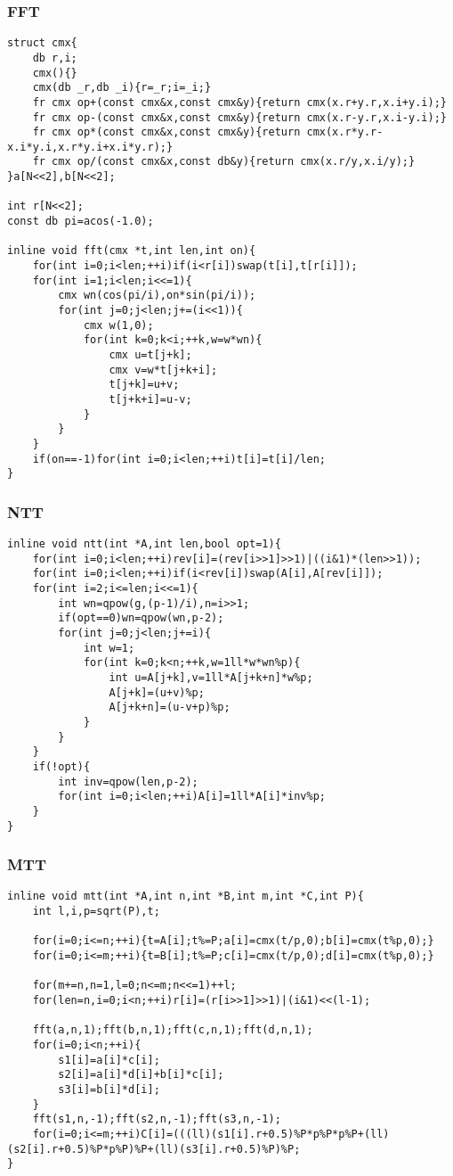 \documentclass{ctexart}
\begin{document}
\subsubsection{FFT}
\begin{lstlisting}
struct cmx{
    db r,i;
    cmx(){}
    cmx(db _r,db _i){r=_r;i=_i;}
    fr cmx op+(const cmx&x,const cmx&y){return cmx(x.r+y.r,x.i+y.i);}
    fr cmx op-(const cmx&x,const cmx&y){return cmx(x.r-y.r,x.i-y.i);}
    fr cmx op*(const cmx&x,const cmx&y){return cmx(x.r*y.r-x.i*y.i,x.r*y.i+x.i*y.r);}
    fr cmx op/(const cmx&x,const db&y){return cmx(x.r/y,x.i/y);}
}a[N<<2],b[N<<2];

int r[N<<2];
const db pi=acos(-1.0);

inline void fft(cmx *t,int len,int on){
    for(int i=0;i<len;++i)if(i<r[i])swap(t[i],t[r[i]]);
    for(int i=1;i<len;i<<=1){
        cmx wn(cos(pi/i),on*sin(pi/i));
        for(int j=0;j<len;j+=(i<<1)){
            cmx w(1,0);
            for(int k=0;k<i;++k,w=w*wn){
                cmx u=t[j+k];
                cmx v=w*t[j+k+i];
                t[j+k]=u+v;
                t[j+k+i]=u-v;
            }
        }
    }
    if(on==-1)for(int i=0;i<len;++i)t[i]=t[i]/len;
}
\end{lstlisting}
\subsubsection{NTT}
\begin{lstlisting}
inline void ntt(int *A,int len,bool opt=1){
    for(int i=0;i<len;++i)rev[i]=(rev[i>>1]>>1)|((i&1)*(len>>1));
    for(int i=0;i<len;++i)if(i<rev[i])swap(A[i],A[rev[i]]);
    for(int i=2;i<=len;i<<=1){
        int wn=qpow(g,(p-1)/i),n=i>>1;
        if(opt==0)wn=qpow(wn,p-2);
        for(int j=0;j<len;j+=i){
            int w=1;
            for(int k=0;k<n;++k,w=1ll*w*wn%p){
                int u=A[j+k],v=1ll*A[j+k+n]*w%p;
                A[j+k]=(u+v)%p;
                A[j+k+n]=(u-v+p)%p;
            }
        }
    }
    if(!opt){
        int inv=qpow(len,p-2);
        for(int i=0;i<len;++i)A[i]=1ll*A[i]*inv%p;
    }
}
\end{lstlisting}
\subsubsection{MTT}
\begin{lstlisting}
inline void mtt(int *A,int n,int *B,int m,int *C,int P){
    int l,i,p=sqrt(P),t;
    
    for(i=0;i<=n;++i){t=A[i];t%=P;a[i]=cmx(t/p,0);b[i]=cmx(t%p,0);}
    for(i=0;i<=m;++i){t=B[i];t%=P;c[i]=cmx(t/p,0);d[i]=cmx(t%p,0);}
    
    for(m+=n,n=1,l=0;n<=m;n<<=1)++l;
    for(len=n,i=0;i<n;++i)r[i]=(r[i>>1]>>1)|(i&1)<<(l-1);
    
    fft(a,n,1);fft(b,n,1);fft(c,n,1);fft(d,n,1);
    for(i=0;i<n;++i){
        s1[i]=a[i]*c[i];
        s2[i]=a[i]*d[i]+b[i]*c[i];
        s3[i]=b[i]*d[i];
    }
    fft(s1,n,-1);fft(s2,n,-1);fft(s3,n,-1);
    for(i=0;i<=m;++i)C[i]=(((ll)(s1[i].r+0.5)%P*p%P*p%P+(ll)(s2[i].r+0.5)%P*p%P)%P+(ll)(s3[i].r+0.5)%P)%P;
}
\end{lstlisting}
\end{document}

